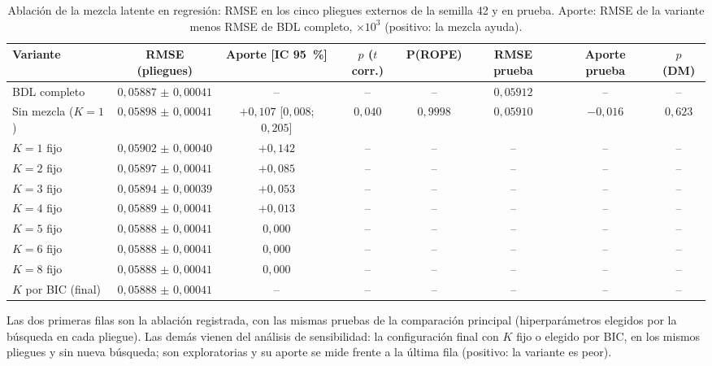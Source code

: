 \begin{table}[tbp]
  \centering\scriptsize\setlength{\tabcolsep}{1.8pt}
  \caption{Ablación de la mezcla latente en regresión: RMSE en los cinco pliegues externos de la semilla 42 y en prueba. Aporte: RMSE de la variante menos RMSE de BDL completo, $\times 10^{3}$ (positivo: la mezcla ayuda).}
  \label{tab:ablacion}
  \begin{tabular}{lccccccc}
    \toprule
    Variante & RMSE (pliegues) & Aporte [IC 95~\%] & $p$ ($t$ corr.) & P(ROPE) & RMSE prueba & Aporte prueba & $p$ (DM) \\
    \midrule
    BDL completo & $0{,}05887$ $\pm$ $0{,}00041$ & -- & -- & -- & $0{,}05912$ & -- & -- \\
    Sin mezcla ($K=1$) & $0{,}05898$ $\pm$ $0{,}00041$ & $+0{,}107$ [$0{,}008$; $0{,}205$] & $0{,}040$ & $0{,}9998$ & $0{,}05910$ & $-0{,}016$ & $0{,}623$ \\
    \midrule
    $K=1$ fijo & $0{,}05902$ $\pm$ $0{,}00040$ & $+0{,}142$ & -- & -- & -- & -- & -- \\
    $K=2$ fijo & $0{,}05897$ $\pm$ $0{,}00041$ & $+0{,}085$ & -- & -- & -- & -- & -- \\
    $K=3$ fijo & $0{,}05894$ $\pm$ $0{,}00039$ & $+0{,}053$ & -- & -- & -- & -- & -- \\
    $K=4$ fijo & $0{,}05889$ $\pm$ $0{,}00041$ & $+0{,}013$ & -- & -- & -- & -- & -- \\
    $K=5$ fijo & $0{,}05888$ $\pm$ $0{,}00041$ & $0{,}000$ & -- & -- & -- & -- & -- \\
    $K=6$ fijo & $0{,}05888$ $\pm$ $0{,}00041$ & $0{,}000$ & -- & -- & -- & -- & -- \\
    $K=8$ fijo & $0{,}05888$ $\pm$ $0{,}00041$ & $0{,}000$ & -- & -- & -- & -- & -- \\
    $K$ por BIC (final) & $0{,}05888$ $\pm$ $0{,}00041$ & -- & -- & -- & -- & -- & -- \\
    \bottomrule
  \end{tabular}
  \par\smallskip\begin{minipage}{0.97\linewidth}\scriptsize Las dos primeras filas son la ablación registrada, con las mismas pruebas de la comparación principal (hiperparámetros elegidos por la búsqueda en cada pliegue). Las demás vienen del análisis de sensibilidad: la configuración final con $K$ fijo o elegido por BIC, en los mismos pliegues y sin nueva búsqueda; son exploratorias y su aporte se mide frente a la última fila (positivo: la variante es peor).\end{minipage}
\end{table}
